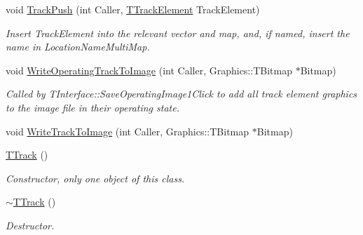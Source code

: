 \begin{DoxyCompactItemize}
void \mbox{\hyperlink{class_t_track_a2d8f9445f873689b8e71d3f8efc7c7d3}{Track\+Push}} (int Caller, \mbox{\hyperlink{class_t_track_element}{T\+Track\+Element}} Track\+Element)
\begin{DoxyCompactList}\small\item\em Insert Track\+Element into the relevant vector and map, and, if named, insert the name in Location\+Name\+Multi\+Map. \end{DoxyCompactList}\item 
\mbox{\label{class_t_track_afb6bf873ba2e4107cf462f9d42dbe33f}} 
void \mbox{\hyperlink{class_t_track_afb6bf873ba2e4107cf462f9d42dbe33f}{Write\+Operating\+Track\+To\+Image}} (int Caller, Graphics\+::\+T\+Bitmap $\ast$Bitmap)
\begin{DoxyCompactList}\small\item\em Called by T\+Interface\+::\+Save\+Operating\+Image1\+Click to add all track element graphics to the image file in their operating state. \end{DoxyCompactList}\item 
void \mbox{\hyperlink{class_t_track_ab3530b4af2a4b2a9cd1c1b480a19298d}{Write\+Track\+To\+Image}} (int Caller, Graphics\+::\+T\+Bitmap $\ast$Bitmap)
\item 
\mbox{\label{class_t_track_a2db41b793217546f23d218294c088996}} 
\mbox{\hyperlink{class_t_track_a2db41b793217546f23d218294c088996}{T\+Track}} ()
\begin{DoxyCompactList}\small\item\em Constructor, only one object of this class. \end{DoxyCompactList}\item 
\mbox{\label{class_t_track_aefdbe7fe9d1092aa9c543a0bb16c84a0}} 
\mbox{\hyperlink{class_t_track_aefdbe7fe9d1092aa9c543a0bb16c84a0}{$\sim$\+T\+Track}} ()
\begin{DoxyCompactList}\small\item\em Destructor. \end{DoxyCompactList}\end{DoxyCompactItemize}
